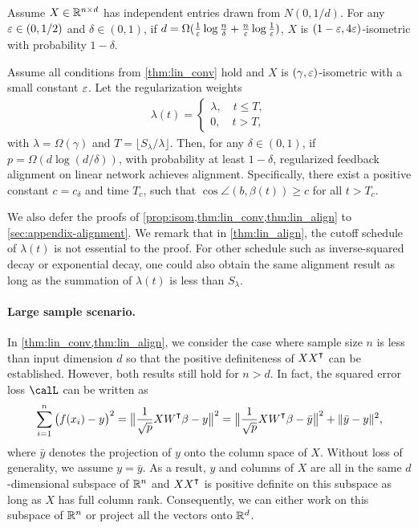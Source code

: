 \begin{proposition}
\label{prop:isom}
Assume $X\in\mathbb{R}^{n\times d}$ has independent entries drawn from $N(0,1/d)$. For any $\varepsilon \in (0,1/2)$ and $\delta \in (0,1)$, if $d=\Omega(\frac{1}{\varepsilon}\log\frac{n}{\delta}+\frac{n}{\varepsilon}\log \frac{1}{\varepsilon})$, $X$ is $(1-\varepsilon, 4\varepsilon)$-isometric with probability $1-\delta$.
\end{proposition}

\begin{theorem}
\label{thm:lin_align}
Assume all conditions from \cref{thm:lin_conv} hold and $X$ is $(\gamma, \varepsilon)$-isometric with a small constant $\varepsilon$. Let the regularization weights
\begin{align*}
\lambda(t) = 
\begin{cases}
    \lambda, \quad t\leq T,\\
    0, \quad t > T,
\end{cases}
\end{align*}
with $\lambda=\Omega(\gamma)$ and $T = \lfloor S_\lambda/\lambda\rfloor$. Then, for any $\delta\in(0,1)$, if $p = \Omega(d\log(d/\delta))$, with probability at least $1-\delta$, regularized feedback alignment on linear network achieves alignment. Specifically, there exist a positive constant $c=c_\delta$ and time $T_c$, such that $\cos\angle(b, \beta(t))\geq c$ for all $t>T_c$.
\end{theorem}

We also defer the proofs of \cref{prop:isom,thm:lin_conv,thm:lin_align} to \cref{sec:appendix-alignment}. We remark that in \cref{thm:lin_align}, the cutoff schedule of $\lambda(t)$ is not essential to the proof. For other schedule such as inverse-squared decay or exponential decay, one could also obtain the same alignment result as long as the summation of $\lambda(t)$ is less than $S_\lambda$.

\paragraph{Large sample scenario.} In \cref{thm:lin_conv,thm:lin_align}, we consider the case where sample size $n$ is less than input dimension $d$ so that the positive definiteness of $XX\transpose$ can be established. However, both results still hold for $n>d$. In fact, the squared error loss $\calL$ can be written as
\begin{equation*}
\sum_{i=1}^n\big(f(x_i)-y\big)^2 = \big\|\frac{1}{\sqrt{p}}XW\transpose\beta-y\big\|^2 = \big\|\frac{1}{\sqrt{p}}XW\transpose\beta-\bar{y}\big\|^2+ \|\bar{y}-y\|^2,
\end{equation*}
where $\bar{y}$ denotes the projection of $y$ onto the column space of $X$. Without loss of generality, we assume $y=\bar{y}$. As a result, $y$ and columns of $X$ are all in the same $d$-dimensional subspace of ${\mathbb{R}^n}$ and $XX\transpose$ is positive definite on this subspace as long as $X$ has full column rank. Consequently, we can either work on this subspace of ${\mathbb{R}^n}$ or project all the vectors onto ${\mathbb{R}^{d}}$.


